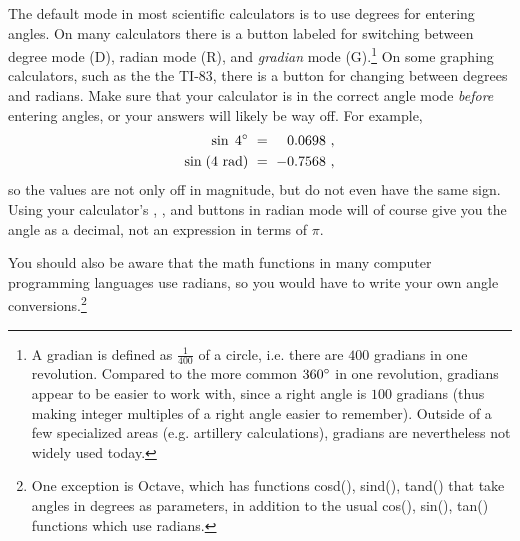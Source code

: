 The default mode in most scientific calculators is to use degrees for entering angles. On many
calculators there is a button labeled {\setlength\fboxsep{2pt}} for
switching between degree mode (D),
radian mode (R), and \emph{gradian} mode (G).\footnote{A gradian is defined as
$\tfrac{1}{400}$ of a circle, i.e. there are $400$ gradians in one revolution. Compared to the
more common $360^\circ$ in one revolution, gradians appear to be easier to work with, since a
right angle is $100$ gradians (thus making integer multiples of a right angle easier to remember).
Outside of a few specialized areas (e.g. artillery calculations), gradians are nevertheless not
widely used today.} On some graphing calculators, such as the the TI-83, there is a
{\setlength\fboxsep{2pt}} button for changing between degrees and
radians. Make sure that your calculator is in the correct angle mode \emph{before} entering angles,
or your answers will likely be way off. For example,
\begin{align*}
 \sin\;4^\circ ~&=~ \phantom{-}0.0698 ~,\\
 \sin\;(4~\text{rad}) ~&=~ -0.7568 ~,
\end{align*}
so the values are not only off in magnitude, but do not even have the same sign.
Using your calculator's {\setlength\fboxsep{1pt}},
{\setlength\fboxsep{1pt}}, and
{\setlength\fboxsep{1pt}} buttons in radian mode will of course
give you the angle as a decimal, not an expression in terms of $\pi$.

You should also be aware that the math functions in many computer programming languages use
radians, so you would have to write your own angle conversions.\footnote{One exception is Octave,
which has functions cosd(), sind(), tand() that take angles in degrees as parameters, in addition to
the usual cos(), sin(), tan() functions which use radians.}

\divider
\vspace{2mm}

